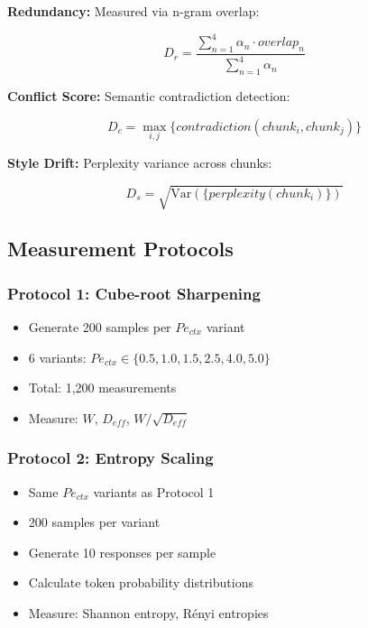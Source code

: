\documentclass[conference]{IEEEtran}
\begin{document}
\textbf{Redundancy:} Measured via n-gram overlap:

\begin{equation}
D_r = \frac{\sum_{n=1}^{4} \alpha_n \cdot overlap_n}{\sum_{n=1}^{4} \alpha_n}
\end{equation}

\textbf{Conflict Score:} Semantic contradiction detection:

\begin{equation}
D_c = \max_{i,j} \{contradiction(chunk_i, chunk_j)\}
\end{equation}

\textbf{Style Drift:} Perplexity variance across chunks:

\begin{equation}
D_s = \sqrt{\text{Var}(\{perplexity(chunk_i)\})}
\end{equation}

\subsection{Measurement Protocols}

\subsubsection{Protocol 1: Cube-root Sharpening}

\begin{itemize}
\item Generate 200 samples per $Pe_{ctx}$ variant
\item 6 variants: $Pe_{ctx} \in \{0.5, 1.0, 1.5, 2.5, 4.0, 5.0\}$
\item Total: 1,200 measurements
\item Measure: $W$, $D_{eff}$, $W/\sqrt{D_{eff}}$
\end{itemize}

\subsubsection{Protocol 2: Entropy Scaling}

\begin{itemize}
\item Same $Pe_{ctx}$ variants as Protocol 1
\item 200 samples per variant
\item Generate 10 responses per sample
\item Calculate token probability distributions
\item Measure: Shannon entropy, Rényi entropies
\end{itemize}
\end{document}

